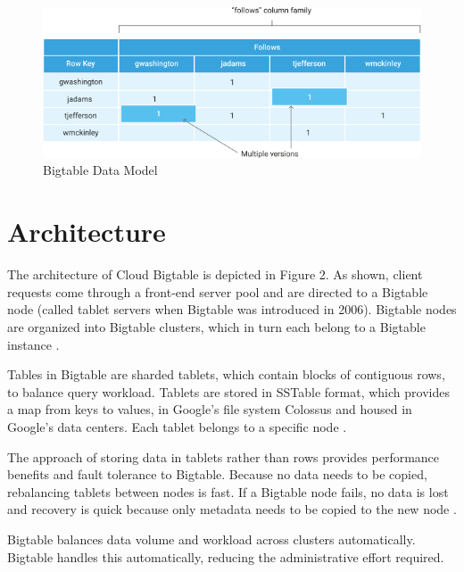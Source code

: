 \documentclass[9pt,twocolumn,twoside]{../../styles/osajnl}
\begin{document}
\begin{figure}[ht]
  \includegraphics[scale=0.45]{images/bigtable-example.jpg}
  \caption{Bigtable Data Model \cite{www-bigtabledocoverview}}
\end{figure}

\section{Architecture}

The architecture of Cloud Bigtable is depicted in Figure 2.  As shown, client requests come through a front-end server pool and are directed to a Bigtable node (called tablet servers when Bigtable was introduced in 2006). Bigtable nodes are organized into Bigtable clusters, which in turn each belong to a Bigtable instance \cite{www-bigtabledocoverview}.

Tables in Bigtable are sharded tablets, which contain blocks of contiguous rows, to balance query workload. Tablets are stored in SSTable format, which provides a map from keys to values, in Google's file system Colossus and housed in Google's data centers. Each tablet belongs to a specific node \cite{www-bigtabledocoverview}.

The approach of storing data in tablets rather than rows provides performance benefits and fault tolerance to Bigtable. Because no data needs to be copied, rebalancing tablets between nodes is fast. If a Bigtable node fails, no data is lost and recovery is quick because only metadata needs to be copied to the new node  \cite{www-bigtabledocoverview}.

Bigtable balances data volume and workload across clusters automatically. Bigtable handles this automatically, reducing the administrative effort required\cite{www-bigtabledocoverview}.


\end{document}
